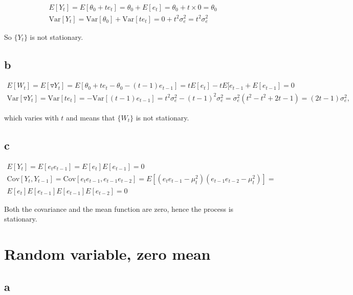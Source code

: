 \documentclass[]{book}
\theoremstyle{definition}
\theoremstyle{definition}
\theoremstyle{remark}
\begin{document}
\begin{gather*}
  E[Y_t]= E[\theta_0 +  t e_t] = \theta_0 + E[e_t] = \theta_0+t \times 0 = \theta_0\\
\text{Var}[Y_t] = \text{Var}[\theta_0] + \text{Var}[t e_t] = 0 + t^2\sigma_e^2 = t^2\sigma_e^2
\end{gather*}

So \(\{Y_t\}\) is not stationary.

\subsection*{b}\label{b-10}

\begin{gather*}
  E[W_t] = E[\triangledown Y_t] = E[\theta_0 + te_t - \theta_0 - (t-1)e_{t-1}] =
    tE[e_t] - tE[e_{t-1} + E[e_{t-1}] = 0 \\
  \text{Var}[\triangledown Y_t] = \text{Var}[t e_t] = - \text{Var}[(t-1)e_{t-1}] = 
    t^2 \sigma_e^2 - (t-1)^2 \sigma_e^2 = \sigma_e^2 (t^2 - t^2 + 2t - 1) = (2t-1)\sigma_e^2,
\end{gather*}

which varies with \(t\) and means that \(\{W_t\}\) is not stationary.

\subsection*{c}\label{c-4}

\begin{gather*}
  E[Y_t] = E[e_t e_{t-1}] = E[e_t] E[e_{t-1}] = 0\\
  \text{Cov}[Y_t, Y_{t-1}] = \text{Cov}[e_t e_{t-1}, e_{t-1} e_{t-2}] = E[(e_t e_{t-1} - \mu_t^2)(e_{t-1} e_{t-2} - \mu_t^2)] =\\
  E[e_t]E[e_{t-1}]E[e_{t-1}]E[e_{t-2}] = 0
\end{gather*}

Both the covariance and the mean function are zero, hence the process is
stationary.

\section{Random variable, zero mean}\label{random-variable-zero-mean}

\subsection*{a}\label{a-11}
\end{document}
